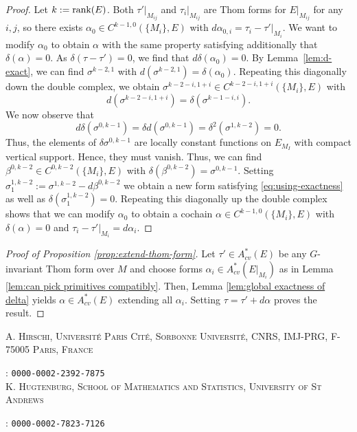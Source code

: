 \documentclass[11pt,psamsfonts, oneside, reqno]{amsart}
\makeatletter
\newcommand{\rank}{\normalfont\text{rank}}
\newcommand{\al}{\alpha}
\theoremstyle{definition}
\theoremstyle{remark}
\numberwithin{equation}{section}
\newcommand{\Addresses}{{%
  \bigskip
  \footnotesize
\textsc{A. Hirschi, Université Paris Cité, Sorbonne Université, CNRS, IMJ-PRG, F-75005 Paris, France}\par\nopagebreak
\text{ORCID}: \texttt{0000-0002-2392-7875}\\
  
  \textsc{K. Hugtenburg, School of Mathematics and Statistics, University of St Andrews}\par\nopagebreak
  \text{ORCID}: \texttt{0000-0002-7823-7126}
}}
\makeatother
\begin{document}
\begin{proof} Let $k:= \rank(E)$.
	Both $\tau'|_{M_{ij}}$ and $\tau_i|_{M_{ij}}$ are Thom forms for $E|_{M_{ij}}$ for any $i,j$, so there exists $\alpha_0 \in C^{k-1,0}(\{M_i\},E)$ with $d\alpha_{0,i} = \tau_i - \tau'|_{M_i}$. We want to modify $\al_0$ to obtain $\alpha$ with the same property satisfying additionally that $\delta(\alpha) = 0$. As $\delta(\tau-\tau') = 0$, we find that $d\delta(\al_0) = 0$. By Lemma~\ref{lem:d-exact}, we can find $\sigma^{k-2,1}$ with $d(\sigma^{k-2,1}) = \delta(\al_0)$. 
	Repeating this diagonally down the double complex, we obtain $\sigma^{k-2-i,1+i}\in C^{k-2-i,1+i}(\{M_i\},E)$ with 
	\begin{equation}\label{eq:using-exactness}d(\sigma^{k-2-i,1+i}) = \delta(\sigma^{k-1-i,i}). \end{equation}
	 We now observe that 
	$$d\delta( \sigma^{0,k-1}) = \delta d (\sigma^{0,k-1}) = \delta^2( \sigma^{1,k-2}) = 0.$$ 
	Thus, the elements of $\delta \sigma^{0,k-1}$ are locally constant functions on $E_{M_I}$ with compact vertical support. Hence, they must vanish. Thus, we can find $\beta^{0,k-2}\in C^{0,k-2}(\{M_i\},E)$ with $\delta(\beta^{0,k-2}) = \sigma^{0,k-1}$. Setting $\sigma^{1,k-2}_1 :=\sigma^{1,k-2}-d\beta^{0,k-2}$ we obtain a new form satisfying \eqref{eq:using-exactness} as well as $\delta( \sigma^{1,k-2}_1) = 0$. Repeating this diagonally up the double complex shows that we can modify $\al_0$ to obtain a cochain $\alpha\in C^{k-1,0}(\{M_i\},E)$ with $\delta(\al) = 0$ and $\tau_i -\tau'|_{M_i} = d\alpha_i$.
\end{proof}



\begin{proof}[Proof of Proposition \ref{prop:extend-thom-form}]
	Let $\tau'\in A_{cv}^*(E)$ be any $G$-invariant Thom form over $M$ and choose forms $\alpha_i \in A_{cv}^*(E|_{M_i})$ as in Lemma \ref{lem:can pick primitives compatibly}. Then, Lemma \ref{lem:global exactness of delta} yields $\alpha \in A_{cv}^*(E)$ extending all $\alpha_i$. Setting $\tau = \tau' + d\alpha$ proves the result.
\end{proof}







\smallskip
\Addresses
\end{document}
